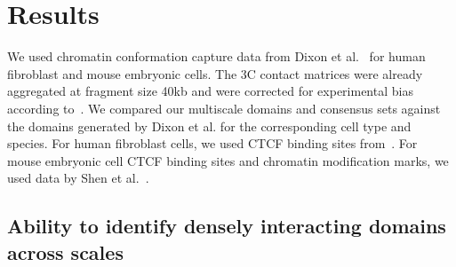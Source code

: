 \documentclass[12pt]{cmuthesis}
\begin{document}
%
%
\section{Results}

  We used chromatin conformation capture data from Dixon et al.~\cite{Dixon2012} for human fibroblast and mouse embryonic cells. The 3C contact matrices were already aggregated at fragment size 40kb and were corrected for experimental bias according to~\cite{Yaffe2011}. We compared our multiscale domains and consensus sets against the domains generated by Dixon et al. for the corresponding cell type and species.
  For human fibroblast cells, we used CTCF binding sites from~\cite{Kim2007}.
  For mouse embryonic cell CTCF binding sites and chromatin modification marks, we used data by Shen et al.~\cite{Shen2012}.



  \subsection{Ability to identify densely interacting domains across scales}
\end{document}
